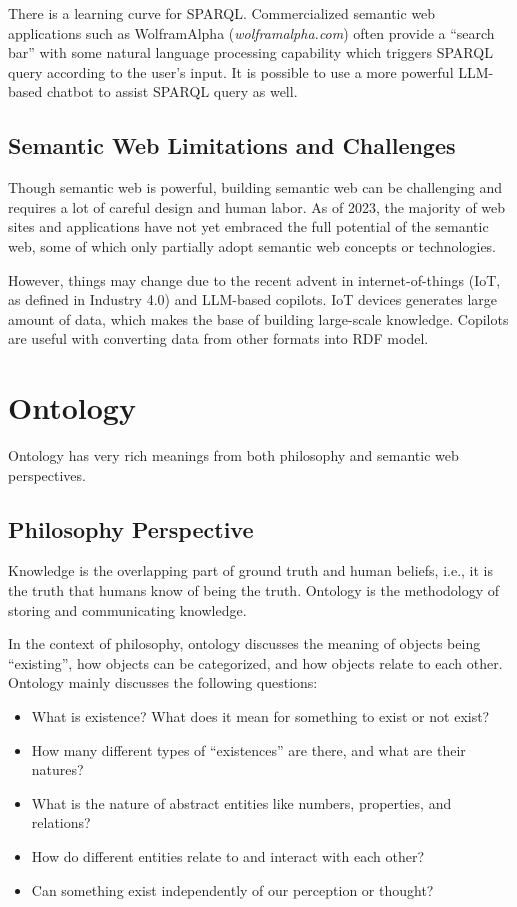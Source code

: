 There is a learning curve for SPARQL. Commercialized semantic web applications such as WolframAlpha (\textit{wolframalpha.com}) often provide a ``search bar'' with some natural language processing capability which triggers SPARQL query according to the user's input. It is possible to use a more powerful LLM-based chatbot to assist SPARQL query as well.

\subsection{Semantic Web Limitations and Challenges}

Though semantic web is powerful, building semantic web can be challenging and requires a lot of careful design and human labor. As of 2023, the majority of web sites and applications have not yet embraced the full potential of the semantic web, some of which only partially adopt semantic web concepts or technologies.

However, things may change due to the recent advent in internet-of-things (IoT, as defined in Industry 4.0) and LLM-based copilots. IoT devices generates large amount of data, which makes the base of building large-scale knowledge. Copilots are useful with converting data from other formats into RDF model. 


\section{Ontology} \label{sec:ontology}

Ontology has very rich meanings from both philosophy and semantic web perspectives.

\subsection{Philosophy Perspective}

Knowledge is the overlapping part of ground truth and human beliefs, i.e., it is the truth that humans know of being the truth. Ontology is the methodology of storing and communicating knowledge.

In the context of philosophy, ontology discusses the meaning of objects being ``existing'', how objects can be categorized, and how objects relate to each other. Ontology mainly discusses the following questions:

\begin{itemize}
  \item What is existence? What does it mean for something to exist or not exist?
  \item How many different types of ``existences'' are there, and what are their natures?
  \item What is the nature of abstract entities like numbers, properties, and relations?
  \item How do different entities relate to and interact with each other?
  \item Can something exist independently of our perception or thought?
\end{itemize}

